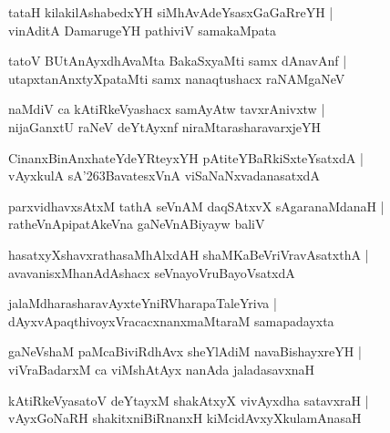 \documentclass[twoside,12pt,openright]{book}
\def\S{\char'263}
\newcounter{shloka}[chapter]
\begin{document}
\begin{shloka}%
tataH kilakilAshabedxYH siMhAvAdeYsasxGaGaRreYH |\\
vinAditA DamarugeYH pathiviV samakaMpata
\end{shloka}

\begin{shloka}%
tatoV BUtAnAyxdhAvaMta BakaSxyaMti samx dAnavAnf |\\
utapxtanAnxtyXpataMti samx nanaqtushacx raNAMgaNeV 
\end{shloka}

\begin{shloka}%
naMdiV ca kAtiRkeVyashacx samAyAtw tavxrAnivxtw |\\
nijaGanxtU raNeV deYtAyxnf niraMtarasharavarxjeYH 
\end{shloka}

\begin{shloka}%
CinanxBinAnxhateYdeYRteyxYH pAtiteYBaRkiSxteYsatxdA |\\
vAyxkulA sA\S BavatesxVnA viSaNaNxvadanasatxdA 
\end{shloka}

\begin{shloka}%
parxvidhavxsAtxM tathA seVnAM daqSAtxvX sAgaranaMdanaH |\\
ratheVnApipatAkeVna gaNeVnABiyayw baliV
\end{shloka}

\begin{shloka}%
hasatxyXshavxrathasaMhAlxdAH shaMKaBeVriVravAsatxthA |\\
avavanisxMhanAdAshacx seVnayoVruBayoVsatxdA
\end{shloka}

\begin{shloka}%
jalaMdharasharavAyxteYniRVharapaTaleYriva |\\
dAyxvApaqthivoyxVracacxnanxmaMtaraM samapadayxta
\end{shloka}

\begin{shloka}%
gaNeVshaM paMcaBiviRdhAvx sheYlAdiM navaBishayxreYH |\\
viVraBadarxM ca viMshAtAyx nanAda jaladasavxnaH
\end{shloka}

\begin{shloka}%
kAtiRkeVyasatoV deYtayxM shakAtxyX vivAyxdha satavxraH |\\
vAyxGoNaRH shakitxniBiRnanxH kiMcidAvxyXkulamAnasaH 
\end{shloka}
\end{document}
